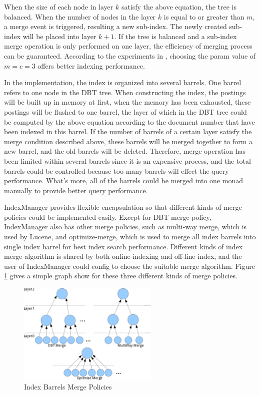 When the size of each node in layer $k$ satisfy the above equation, the tree is balanced. When the number of nodes in the layer $k$ is equal to or greater than $m$, a merge event is triggered, resulting a new sub-index. The newly created sub-index will be placed into layer $k+1$. If the tree is balanced and a sub-index merge operation is only performed on one layer, the efficiency of merging process can be guaranteed.   According to the experiments in \cite{guo2007eli}, choosing the param value of $m=c=3$ offers better indexing performance. \par

In the implementation, the index is organized into several barrels. One barrel refers to one node in the DBT tree. When constructing the index, the postings will be built up in memory at first, when the memory has been exhausted, these postings will be flushed to one barrel, the layer of which in the DBT tree could be computed by the above equation according to the document number that have been indexed in this barrel. If the number of barrels of a certain layer satisfy the merge condition described above, these barrels will be merged together to form a new barrel, and the old barrels will be deleted. Therefore, merge operation has been limited within several barrels since it is an expensive process, and the total barrels could be controlled because too many barrels will effect the query performance. What's more, all of the barrels could be merged into one monad manually to provide better query performance.


IndexManager provides flexible encapsulation so that different kinds of merge policies could be implemented easily. Except for DBT merge policy, IndexManager also has other merge policies, such as multi-way merge, 
which is used by Lucene\cite{lucene}, and optimize-merge, which is used to merge all index barrels into single index barrel for best index search performance. Different kinds of index merge algorithm is shared by both online-indexing
and off-line index, and the user of IndexManager could config to choose the suitable merge algorithm. Figure \ref{fig:indexcon-barrel2} gives a simple graph show for these three different kinds of merge policies.

\begin{figure}[h!]
\centerline{\includegraphics[width=0.6\textwidth]{Figures/barrel2.png}}
\caption{Index Barrels Merge Policies}\label{fig:indexcon-barrel2}
\end{figure}


